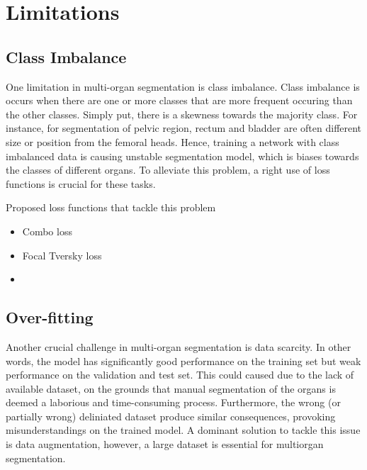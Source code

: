 \chapter{Limitations} \label{chap:limitations}

\section{Class Imbalance}
One limitation in multi-organ segmentation is class imbalance. Class imbalance is occurs 
when there are one or more classes that are more frequent occuring than the other classes. 
Simply put, there is a skewness towards the majority class.
For instance, for segmentation of pelvic region, rectum and bladder 
are often different size or position from the femoral heads.
Hence, training a network with class imbalanced data is causing 
unstable segmentation model, which is biases towards the classes 
of different organs. To alleviate this problem, a right use of loss 
functions is crucial for these tasks.

Proposed loss functions that tackle this problem
\begin{itemize}
        \item Combo loss
        \item Focal Tversky loss
        \item 
\end{itemize}

\section{Over-fitting}
Another crucial challenge in multi-organ segmentation is data scarcity. In other words, 
the model has significantly good performance on the training set but weak performance 
on the validation and test set. This could caused due to the lack of available dataset, on the grounds 
that manual segmentation of the organs is deemed a laborious and time-consuming process. 
Furthermore, the wrong (or partially wrong) deliniated dataset produce similar consequences, 
provoking misunderstandings on the trained model. A dominant solution to tackle this issue is data augmentation, however, 
a large dataset is essential for multiorgan segmentation.